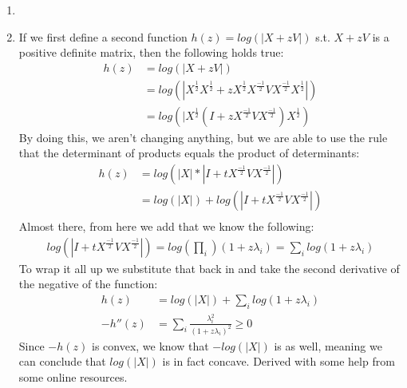 \documentclass[11pt,a4paper]{article}
\begin{document}
\begin{enumerate}
			\item 
			\item If we first define a second function $h(z) = log(|X+zV|)$ s.t. $X+zV$ is a positive definite matrix, then the following holds true:
			\begin{align*}
			h(z) &= log(|X+zV|) \\
			     &= log(|X^\frac{1}{2}X^\frac{1}{2}+zX^\frac{1}{2}X^\frac{-1}{2}VX^\frac{-1}{2}X^\frac{1}{2}|) \\
			     &= log(|X^\frac{1}{2}(I + zX^\frac{-1}{2}VX^\frac{-1}{2})X^\frac{1}{2})
			\end{align*} 
			By doing this, we aren't changing anything, but we are able to use the rule that the determinant of products equals the product of determinants:
			\begin{align*}
			h(z) &= log(|X|*|I + tX^\frac{-1}{2}VX^\frac{-1}{2}|) \\
				&= log(|X|) + log(|I + tX^\frac{-1}{2}VX^\frac{-1}{2}|) \\
			\end{align*}
			Almost there, from here we add that we know the following:
			\begin{align*}
			log(|I + tX^\frac{-1}{2}VX^\frac{-1}{2}|) = log(\prod_i)(1+z\lambda_i) = \sum_i log(1+z\lambda_i)
			\end{align*}
			To wrap it all up we substitute that back in and take the second derivative of the negative of the function:
			\begin{align*}
			h(z) &= log(|X|)+\sum_i log(1+z\lambda_i) \\
			-h''(z) &= \sum_i \frac{\lambda_i^2}{(1+z\lambda_i)^2}\geq 0
			\end{align*}
			Since $-h(z)$ is convex, we know that $-log(|X|)$ is as well, meaning we can conclude that $log(|X|)$ is in fact concave. Derived with some help from some online resources.
		\end{enumerate}
\end{document}
